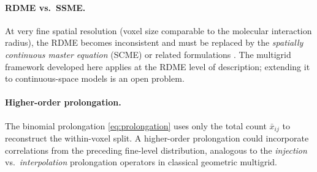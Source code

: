 \documentclass[review,onefignum,onetabnum]{siamart171218}
\begin{document}
\paragraph{RDME vs.\ SSME.}
At very fine spatial resolution (voxel size comparable to the
molecular interaction radius), the RDME becomes inconsistent and
must be replaced by the \emph{spatially continuous master
equation} (SCME) or related formulations \cite{Hellander2012}.
The multigrid framework developed here applies at the RDME level
of description; extending it to continuous-space models is an
open problem.

\paragraph{Higher-order prolongation.}
The binomial prolongation \eqref{eq:prolongation} uses only the
total count $\bar{x}_{ij}$ to reconstruct the within-voxel split.
A higher-order prolongation could incorporate correlations from
the preceding fine-level distribution, analogous to the
\emph{injection} vs.\ \emph{interpolation} prolongation operators
in classical geometric multigrid.



\end{document}
